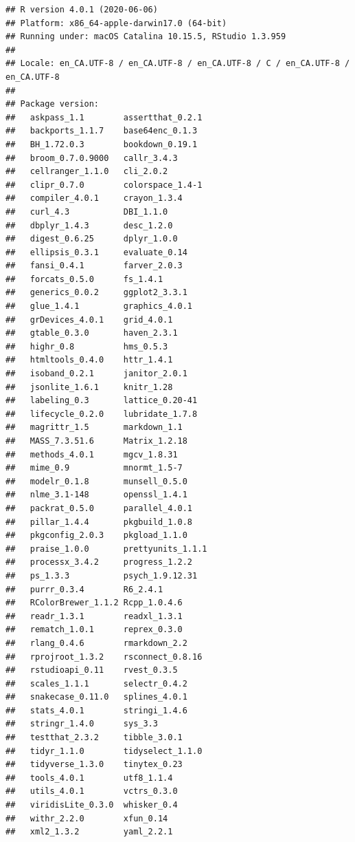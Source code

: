 \documentclass[
]{krantz}
\begin{document}
\begin{verbatim}
## R version 4.0.1 (2020-06-06)
## Platform: x86_64-apple-darwin17.0 (64-bit)
## Running under: macOS Catalina 10.15.5, RStudio 1.3.959
## 
## Locale: en_CA.UTF-8 / en_CA.UTF-8 / en_CA.UTF-8 / C / en_CA.UTF-8 / en_CA.UTF-8
## 
## Package version:
##   askpass_1.1        assertthat_0.2.1  
##   backports_1.1.7    base64enc_0.1.3   
##   BH_1.72.0.3        bookdown_0.19.1   
##   broom_0.7.0.9000   callr_3.4.3       
##   cellranger_1.1.0   cli_2.0.2         
##   clipr_0.7.0        colorspace_1.4-1  
##   compiler_4.0.1     crayon_1.3.4      
##   curl_4.3           DBI_1.1.0         
##   dbplyr_1.4.3       desc_1.2.0        
##   digest_0.6.25      dplyr_1.0.0       
##   ellipsis_0.3.1     evaluate_0.14     
##   fansi_0.4.1        farver_2.0.3      
##   forcats_0.5.0      fs_1.4.1          
##   generics_0.0.2     ggplot2_3.3.1     
##   glue_1.4.1         graphics_4.0.1    
##   grDevices_4.0.1    grid_4.0.1        
##   gtable_0.3.0       haven_2.3.1       
##   highr_0.8          hms_0.5.3         
##   htmltools_0.4.0    httr_1.4.1        
##   isoband_0.2.1      janitor_2.0.1     
##   jsonlite_1.6.1     knitr_1.28        
##   labeling_0.3       lattice_0.20-41   
##   lifecycle_0.2.0    lubridate_1.7.8   
##   magrittr_1.5       markdown_1.1      
##   MASS_7.3.51.6      Matrix_1.2.18     
##   methods_4.0.1      mgcv_1.8.31       
##   mime_0.9           mnormt_1.5-7      
##   modelr_0.1.8       munsell_0.5.0     
##   nlme_3.1-148       openssl_1.4.1     
##   packrat_0.5.0      parallel_4.0.1    
##   pillar_1.4.4       pkgbuild_1.0.8    
##   pkgconfig_2.0.3    pkgload_1.1.0     
##   praise_1.0.0       prettyunits_1.1.1 
##   processx_3.4.2     progress_1.2.2    
##   ps_1.3.3           psych_1.9.12.31   
##   purrr_0.3.4        R6_2.4.1          
##   RColorBrewer_1.1.2 Rcpp_1.0.4.6      
##   readr_1.3.1        readxl_1.3.1      
##   rematch_1.0.1      reprex_0.3.0      
##   rlang_0.4.6        rmarkdown_2.2     
##   rprojroot_1.3.2    rsconnect_0.8.16  
##   rstudioapi_0.11    rvest_0.3.5       
##   scales_1.1.1       selectr_0.4.2     
##   snakecase_0.11.0   splines_4.0.1     
##   stats_4.0.1        stringi_1.4.6     
##   stringr_1.4.0      sys_3.3           
##   testthat_2.3.2     tibble_3.0.1      
##   tidyr_1.1.0        tidyselect_1.1.0  
##   tidyverse_1.3.0    tinytex_0.23      
##   tools_4.0.1        utf8_1.1.4        
##   utils_4.0.1        vctrs_0.3.0       
##   viridisLite_0.3.0  whisker_0.4       
##   withr_2.2.0        xfun_0.14         
##   xml2_1.3.2         yaml_2.2.1
\end{verbatim}
\end{document}
